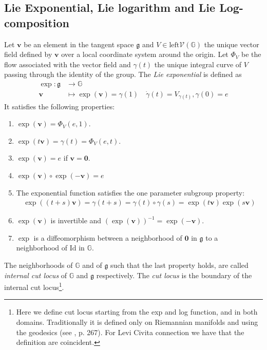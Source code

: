 \subsection{Lie Exponential, Lie logarithm and Lie Log-composition}\label{se:lie_exp_log_comp}
Let $\mathbf{v}$ be an element in the tangent space $\mathfrak{g}$ and $V\in\text{left}\mathcal{V}(\mathbb{G})$ the unique vector field defined by $\mathbf{v}$ over a local coordinate system around the origin. Let $\Phi_{V}$ be the flow associated with the vector field and $\gamma(t)$ the unique integral curve of $V$ passing through the identity of the group.  
The \emph{Lie exponential} is defined as
\begin{align*}
\exp :  \mathfrak{g} & \longrightarrow  \mathbb{G}  \\
\mathbf{v} &\longmapsto  \exp(\mathbf{v} ) = \gamma(1) \quad \dot{\gamma}(t) = V_{\gamma(t)}, \gamma(0) = e
\end{align*}
It satisfies the following properties:
\begin{enumerate}
	\item $\exp(\mathbf{v}) = \Phi_{V}(e,1)$.
	\item $\exp(t\mathbf{v}) =\gamma(t) = \Phi_{V}(e,t)$.
	\item $\exp(\mathbf{v}) = e$ if $\mathbf{v} = \mathbf{0}$.
	\item $\exp(\mathbf{v})\circ \exp(\mathbf{-v})  = e$
	\item The exponential function satisfies the one parameter subgroup property:
	\begin{align*}
	\exp((t+s)\mathbf{v}) = \gamma(t+s) = \gamma(t)\circ \gamma(s) = \exp(t\mathbf{v})\exp(s\mathbf{v})
	\end{align*}
	\item $\exp(\mathbf{v})$ is invertible and $(\exp(\mathbf{v}))^{-1} = \exp(-\mathbf{v})$.
	\item $\exp$ is a diffeomorphism between a neighborhood of $\mathbf{0}$ in $\mathfrak{g}$ to a neighborhood of $\text{Id}$ in $\mathbb{G}$.
\end{enumerate}
The neighborhoods of $\mathbb{G}$ and of $\mathfrak{g}$ such that the last property holds, are called \emph{internal cut locus} of $\mathbb{G}$ and $\mathfrak{g}$ respectively. The \emph{cut locus} is the boundary of the internal cut locus\footnote{Here we define cut locus starting from the exp and log function, and in both domains. Traditionally it is defined only on Riemannian manifolds and using the geodesics (see \cite{do1992riemannian}, p. 267). For Levi Civita connection we have that the definition are coincident.}.\\
